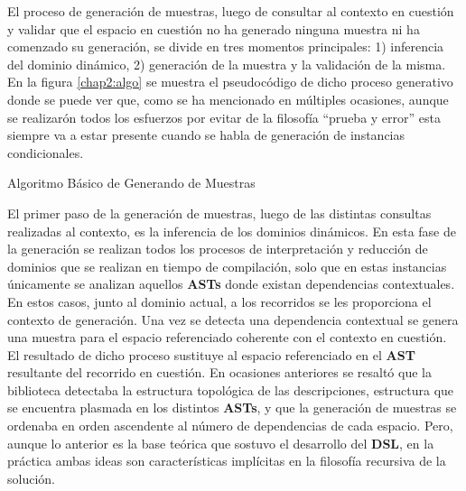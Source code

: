 El proceso de generación de muestras, luego de consultar al contexto en cuestión y validar que el espacio en cuestión no ha
generado ninguna muestra ni ha comenzado su generación, se divide en tres momentos principales: 1) inferencia del dominio
dinámico, 2) generación de la muestra y la validación de la misma. En la figura \ref{chap2:algo} se muestra el pseudocódigo de dicho
proceso generativo donde se puede ver que, como se ha mencionado en múltiples ocasiones, aunque se realizarón todos los
esfuerzos por evitar de la filosofía “prueba y error” esta siempre va a estar presente cuando se habla de generación de
instancias condicionales.

\begin{algorithm}[H]
    \SetAlgoLined
    \caption{Algoritmo Básico de Generando de Muestras\label{chap2:algo}}
\end{algorithm}


El primer paso de la generación de muestras, luego de las distintas consultas realizadas al contexto,
es la inferencia de los dominios dinámicos. En esta fase de la generación se realizan todos los procesos
de interpretación y reducción de dominios que se realizan en tiempo de compilación, solo que en estas
instancias únicamente se analizan aquellos {\bf ASTs} donde existan dependencias contextuales. 
En estos casos, junto al dominio actual, a los recorridos se les proporciona el contexto de generación. 
Una vez se detecta una dependencia contextual se genera una muestra para el espacio referenciado coherente con el 
contexto en cuestión. El resultado de dicho proceso sustituye al espacio referenciado en el {\bf AST} resultante 
del recorrido en cuestión. En ocasiones anteriores se resaltó que la biblioteca detectaba la estructura topológica de 
las descripciones, estructura que se encuentra plasmada en los distintos {\bf ASTs}, y que la generación de muestras 
se ordenaba en orden ascendente al número de dependencias de cada espacio. Pero, aunque lo anterior es la base 
teórica que sostuvo el desarrollo del {\bf DSL}, en la práctica ambas ideas son características implícitas en la 
filosofía recursiva de la solución.

